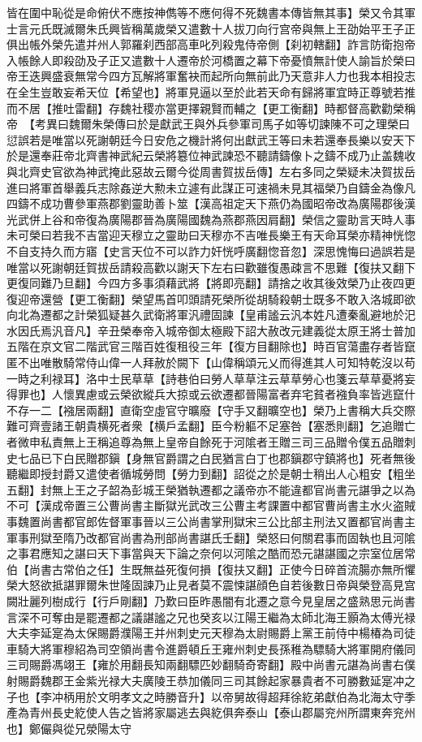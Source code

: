 皆在圍中恥從是命俯伏不應按神儁等不應何得不死魏書本傳皆無其事】榮又令其軍士言元氏既滅爾朱氏興皆稱萬歲榮又遣數十人拔刀向行宫帝與無上王劭始平王子正俱出帳外榮先遣并州人郭羅刹西部高車叱列殺鬼侍帝側【刹初轄翻】詐言防衛抱帝入帳餘人即殺劭及子正又遣數十人遷帝於河橋置之幕下帝憂憤無計使人諭旨於榮曰帝王迭興盛衰無常今四方瓦解將軍奮袂而起所向無前此乃天意非人力也我本相投志在全生豈敢妄希天位【希望也】將軍見逼以至於此若天命有歸將軍宜時正尊號若推而不居【推吐雷翻】存魏社稷亦當更擇親賢而輔之【更工衡翻】時都督高歡勸榮稱帝　【考異曰魏爾朱榮傳曰於是獻武王與外兵參軍司馬子如等切諫陳不可之理榮曰愆誤若是唯當以死謝朝廷今日安危之機計將何出獻武王等曰未若還奉長樂以安天下於是還奉莊帝北齊書神武紀云榮將簒位神武諫恐不聽請鑄像卜之鑄不成乃止盖魏收與北齊史官欲為神武掩此惡故云爾今從周書賀拔岳傳】左右多同之榮疑未决賀拔岳進曰將軍首舉義兵志除姦逆大勲未立遽有此謀正可速禍未見其福榮乃自鑄金為像凡四鑄不成功曹參軍燕郡劉靈助善卜筮【漢高祖定天下燕仍為國昭帝改為廣陽郡後漢光武併上谷和帝復為廣陽郡晉為廣陽國魏為燕郡燕因肩翻】榮信之靈助言天時人事未可榮曰若我不吉當迎天穆立之靈助曰天穆亦不吉唯長樂王有天命耳榮亦精神恍惚不自支持久而方寤【史言天位不可以詐力奸恍呼廣翻惚音忽】深思愧悔曰過誤若是唯當以死謝朝廷賀拔岳請殺高歡以謝天下左右曰歡雖復愚疎言不思難【復扶又翻下更復同難乃旦翻】今四方多事須藉武將【將即亮翻】請捨之收其後效榮乃止夜四更復迎帝還營【更工衡翻】榮望馬首叩頭請死榮所從胡騎殺朝士既多不敢入洛城即欲向北為遷都之計榮狐疑甚久武衛將軍汎禮固諫【皇甫謐云汎本姓凡遭秦亂避地於汜水因氏焉汎音凡】辛丑榮奉帝入城帝御太極殿下詔大赦改元建義從太原王將士普加五階在京文官二階武官三階百姓復租役三年【復方目翻除也】時百官蕩盡存者皆竄匿不出唯散騎常侍山偉一人拜赦於闕下【山偉稱頌元乂而得進其人可知特乾沒以苟一時之利禄耳】洛中士民草草【詩巷伯曰勞人草草注云草草勞心也箋云草草憂將妄得罪也】人懷異慮或云榮欲縱兵大掠或云欲遷都晉陽富者弃宅貧者襁負率皆逃竄什不存一二【襁居兩翻】直衛空虛官守曠廢【守手又翻曠空也】榮乃上書稱大兵交際難可齊壹諸王朝貴横死者衆【横戶孟翻】臣今粉軀不足塞咎【塞悉則翻】乞追贈亡者微申私責無上王稱追尊為無上皇帝自餘死于河隂者王贈三司三品贈令僕五品贈刺史七品已下白民贈郡鎭【身無官爵謂之白民猶言白丁也郡鎭郡守鎮將也】死者無後聽繼即授封爵又遣使者循城勞問【勞力到翻】詔從之於是朝士稍出人心粗安【粗坐五翻】封無上王之子韶為彭城王榮猶執遷都之議帝亦不能違都官尚書元諶爭之以為不可【漢成帝置三公曹尚書主斷獄光武改三公曹主考課置中都官曹尚書主水火盗賊事魏置尚書都官郎佐督軍事晉以三公尚書掌刑獄宋三公比部主刑法又置都官尚書主軍事刑獄至隋乃改都官尚書為刑部尚書諶氏壬翻】榮怒曰何關君事而固執也且河隂之事君應知之諶曰天下事當與天下論之奈何以河隂之酷而恐元諶諶國之宗室位居常伯【尚書古常伯之任】生既無益死復何損【復扶又翻】正使今日碎首流腸亦無所懼榮大怒欲抵諶罪爾朱世隆固諫乃止見者莫不震悚諶顔色自若後數日帝與榮登高見宫闕壯麗列樹成行【行戶剛翻】乃歎曰臣昨愚闇有北遷之意今見皇居之盛熟思元尚書言深不可奪由是罷遷都之議諶謐之兄也癸亥以江陽王繼為太師北海王顥為太傅光禄大夫李延寔為太保賜爵濮陽王并州刺史元天穆為太尉賜爵上黨王前侍中楊椿為司徒車騎大將軍穆紹為司空領尚書令進爵頓丘王雍州刺史長孫稚為驃騎大將軍開府儀同三司賜爵馮翊王【雍於用翻長知兩翻驃匹妙翻騎奇寄翻】殿中尚書元諶為尚書右僕射賜爵魏郡王金紫光禄大夫廣陵王恭加儀同三司其餘起家暴貴者不可勝數延寔冲之子也【李冲柄用於文明孝文之時勝音升】以帝舅故得超拜徐紇弟獻伯為北海太守季產為青州長史紇使人告之皆將家屬逃去與紇俱奔泰山【泰山郡屬兖州所謂東奔兖州也】鄭儼與從兄滎陽太守